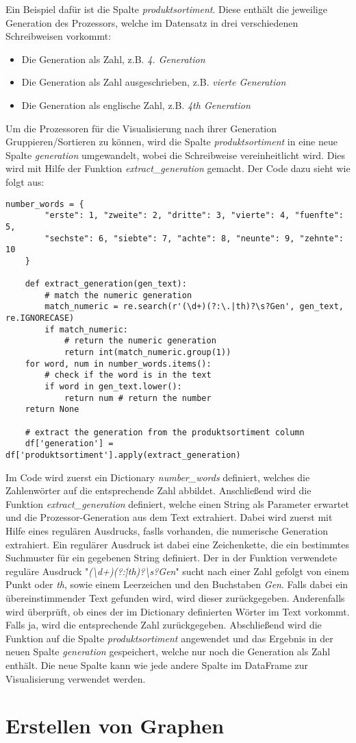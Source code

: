 Ein Beispiel dafür ist die Spalte \textit{produktsortiment}. Diese enthält die jeweilige Generation des Prozessors, welche im Datensatz in drei verschiedenen
Schreibweisen vorkommt:
\begin{itemize}
    \item Die Generation als Zahl, z.B. \textit{4. Generation}
    \item Die Generation als Zahl ausgeschrieben, z.B. \textit{vierte Generation}
    \item Die Generation als englische Zahl, z.B. \textit{4th Generation}
\end{itemize}
Um die Prozessoren für die Visualisierung nach ihrer Generation Gruppieren/Sortieren zu können, wird die Spalte \textit{produktsortiment}
in eine neue Spalte \textit{generation} umgewandelt, wobei die Schreibweise vereinheitlicht wird. Dies wird mit Hilfe der Funktion \textit{extract\_generation}
gemacht. Der Code dazu sieht wie folgt aus:
\begin{lstlisting}[caption={\texttt{Funktion extraxct\_generation}},captionpos=b]
    number_words = {
        "erste": 1, "zweite": 2, "dritte": 3, "vierte": 4, "fuenfte": 5,
        "sechste": 6, "siebte": 7, "achte": 8, "neunte": 9, "zehnte": 10
    }

    def extract_generation(gen_text):
        # match the numeric generation
        match_numeric = re.search(r'(\d+)(?:\.|th)?\s?Gen', gen_text, re.IGNORECASE)
        if match_numeric:
            # return the numeric generation
            return int(match_numeric.group(1))
    for word, num in number_words.items():
        # check if the word is in the text
        if word in gen_text.lower(): 
            return num # return the number
    return None

    # extract the generation from the produktsortiment column
    df['generation'] = df['produktsortiment'].apply(extract_generation) 
\end{lstlisting}

Im Code wird zuerst ein Dictionary \textit{number\_words} definiert, welches die Zahlenwörter auf die entsprechende Zahl abbildet.
Anschließend wird die Funktion \textit{extract\_generation} definiert, welche einen String als Parameter erwartet und die Prozessor-Generation aus dem Text extrahiert.
Dabei wird zuerst mit Hilfe eines regulären Ausdrucks, faslls vorhanden, die numerische Generation extrahiert. Ein regulärer Ausdruck ist dabei eine Zeichenkette,
die ein bestimmtes Suchmuster für ein gegebenen String definiert.
Der in der Funktion verwendete reguläre Ausdruck "\textit{(\textbackslash d+)(?:\.|th)?\textbackslash s?Gen}" sucht nach einer Zahl gefolgt von einem Punkt oder \textit{th},
sowie einem Leerzeichen und den Buchstaben \textit{Gen}. Falls dabei ein übereinstimmender Text gefunden wird, wird dieser zurückgegeben. Anderenfalls wird
überprüft, ob eines der im Dictionary definierten Wörter im Text vorkommt. Falls ja, wird die entsprechende Zahl zurückgegeben.
Abschließend wird die Funktion auf die Spalte \textit{produktsortiment} angewendet und das Ergebnis in der neuen Spalte \textit{generation} gespeichert, welche nur noch die
Generation als Zahl enthält.
Die neue Spalte kann wie jede andere Spalte im DataFrame zur Visualisierung verwendet werden.

\section{Erstellen von Graphen}